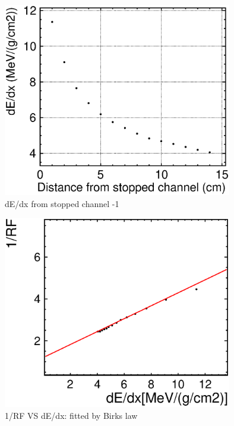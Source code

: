 \begin{figure}[!htb]
  \centering
  \centering
  \includegraphics[width=10cm,clip]{./fig/dEdx.eps}
  \caption{dE/dx from stopped channel -1}
  \label{fadcDistdEdx}
\end{figure}

\begin{figure}[!htb]
  \centering
  \centering
  \includegraphics[width=10cm,clip]{./fig/RFresult.eps}
  \caption{1/RF VS dE/dx: fitted by Birks law}
  \label{result}
\end{figure}

